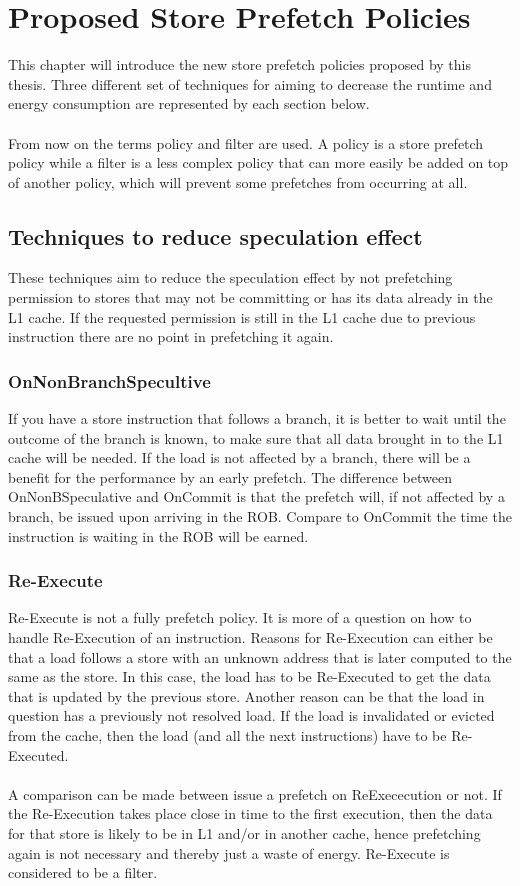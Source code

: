 \chapter{Proposed Store Prefetch Policies}
\label{chap:ProposedPrefetchPolicies}
This chapter will introduce the new store prefetch policies proposed by this thesis. Three different set of techniques for aiming to decrease the runtime and energy consumption are represented by each section below.
\\ \\
From now on the terms policy and filter are used. A policy is a store prefetch policy while a filter is a less complex policy that can more easily be added on top of another policy, which will prevent some prefetches from occurring at all.
\section{Techniques to reduce speculation effect} 
 These techniques aim to reduce the speculation effect by not prefetching permission
to stores that may not be committing or has its data already in the L1 cache. If the
requested permission is still in the L1 cache due to previous instruction there are no
point in prefetching it again.
\subsection{OnNonBranchSpecultive}
If you have a store instruction that follows a branch, it is better to wait until the outcome of the branch is known, to make sure that all data brought in to the L1
cache will be needed. If the load is not affected by a branch, there will be a benefit
for the performance by an early prefetch. The difference between OnNonBSpeculative and OnCommit
is that the prefetch will, if not affected by a branch, be issued upon arriving in the ROB. Compare to OnCommit the time the instruction is waiting in
the ROB will be earned.
\subsection{Re-Execute}
Re-Execute is not a fully prefetch policy. It is more of a question on how to handle Re-Execution of an instruction. 
 Reasons for Re-Execution can
either be that a load follows a store with an unknown address that is later computed to
the same as the store. In this case, the load has to be Re-Executed to get the data that
is updated by the previous store. Another reason can be that the load in question has
a previously not resolved load. If the load is invalidated or evicted from the cache,
then the load (and all the next instructions) have to be Re-Executed.
\\ \\
A comparison can be made between issue a prefetch on ReExececution or not. If the Re-Execution takes place close in time to the first execution, then the data
for that store is likely to be in L1 and/or in another cache, hence prefetching again
is not necessary and thereby just a waste of energy. Re-Execute is considered to be a filter.
